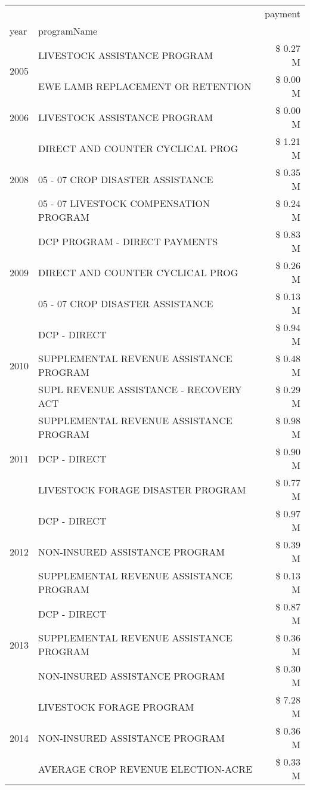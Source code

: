 \begin{tabular}{llr}
\toprule
 &  & payment \\
year & programName &  \\
\midrule
\multirow[t]{2}{*}{2005} & LIVESTOCK ASSISTANCE PROGRAM & \$ 0.27 M \\
 & EWE LAMB REPLACEMENT OR RETENTION & \$ 0.00 M \\
\cline{1-3}
2006 & LIVESTOCK ASSISTANCE PROGRAM & \$ 0.00 M \\
\cline{1-3}
\multirow[t]{3}{*}{2008} & DIRECT AND COUNTER CYCLICAL PROG & \$ 1.21 M \\
 & 05 - 07 CROP DISASTER ASSISTANCE & \$ 0.35 M \\
 & 05 - 07 LIVESTOCK COMPENSATION PROGRAM & \$ 0.24 M \\
\cline{1-3}
\multirow[t]{3}{*}{2009} & DCP PROGRAM - DIRECT PAYMENTS & \$ 0.83 M \\
 & DIRECT AND COUNTER CYCLICAL PROG & \$ 0.26 M \\
 & 05 - 07 CROP DISASTER ASSISTANCE & \$ 0.13 M \\
\cline{1-3}
\multirow[t]{3}{*}{2010} & DCP - DIRECT & \$ 0.94 M \\
 & SUPPLEMENTAL REVENUE ASSISTANCE PROGRAM & \$ 0.48 M \\
 & SUPL REVENUE ASSISTANCE - RECOVERY ACT & \$ 0.29 M \\
\cline{1-3}
\multirow[t]{3}{*}{2011} & SUPPLEMENTAL REVENUE ASSISTANCE PROGRAM & \$ 0.98 M \\
 & DCP - DIRECT & \$ 0.90 M \\
 & LIVESTOCK FORAGE DISASTER PROGRAM & \$ 0.77 M \\
\cline{1-3}
\multirow[t]{3}{*}{2012} & DCP - DIRECT & \$ 0.97 M \\
 & NON-INSURED ASSISTANCE PROGRAM & \$ 0.39 M \\
 & SUPPLEMENTAL REVENUE ASSISTANCE PROGRAM & \$ 0.13 M \\
\cline{1-3}
\multirow[t]{3}{*}{2013} & DCP - DIRECT & \$ 0.87 M \\
 & SUPPLEMENTAL REVENUE ASSISTANCE PROGRAM & \$ 0.36 M \\
 & NON-INSURED ASSISTANCE PROGRAM & \$ 0.30 M \\
\cline{1-3}
\multirow[t]{3}{*}{2014} & LIVESTOCK FORAGE PROGRAM & \$ 7.28 M \\
 & NON-INSURED ASSISTANCE PROGRAM & \$ 0.36 M \\
 & AVERAGE CROP REVENUE ELECTION-ACRE & \$ 0.33 M \\

\end{tabular}

